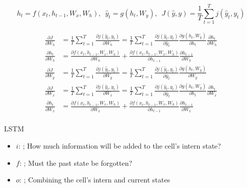 \documentclass{KBook}
\begin{document}
	\[ h_t = f(x_t, h_{t-1}, W_x, W_h),\,\,\, \hat{y}_t = g(h_t, W_y),\,\,\,  J(\hat{y}, y) = \frac{1}{T} \sum_{t=1}^{T} j(\hat{y}_t, y_t)\]
	
	\begin{minipage}{0.6\textwidth}\scriptsize
		\begin{align*}
			\frac{\partial J}{\partial W_h} & = \frac{1}{T} \sum_{t=1}^{T} \frac{\partial j(\hat{y}_t, y_t)}{\partial W_h}
			= \frac{1}{T} \sum_{t=1}^{T} \frac{\partial j(\hat{y}_t, y_t)}{\partial \hat{y}_t} 
			\frac{\partial g(h_t, W_y)}{\partial h_t} 
			\frac{\partial h_t}{\partial W_h} \\
			\frac{\partial h_t}{\partial W_h} & = 
			\frac{\partial f(x_t, h_{t-1}, W_x, W_h)}{\partial W_h} + 
			\frac{\partial f(x_t, h_{t-1}, W_x, W_h)}{\partial h_{t-1}} \frac{\partial h_{t-1}}{\partial W_h} \\
			\frac{\partial J}{\partial W_y} & =
			\frac{1}{T} \sum_{t=1}^{T} \frac{\partial j(\hat{y}_t, y_t)}{\partial W_y}
			= \frac{1}{T} \sum_{t=1}^{T} \frac{\partial j(\hat{y}_t, y_t)}{\partial \hat{y}_t} 
			\frac{\partial g(h_t, W_y)}{\partial W_y} \\
			\frac{\partial J}{\partial W_x} & = 
			\frac{1}{T} \sum_{t=1}^{T} \frac{\partial j(\hat{y}_t, y_t)}{\partial W_x}
			= \frac{1}{T} \sum_{t=1}^{T} \frac{\partial j(\hat{y}_t, y_t)}{\partial \hat{y}_t} 
			\frac{\partial g(h_t, W_y)}{\partial h_t} 
			\frac{\partial h_t}{\partial W_x} \\
			\frac{\partial h_t}{\partial W_x} & = 
			\frac{\partial f(x_t, h_{t-1}, W_x, W_h)}{\partial W_x} + 
			\frac{\partial f(x_t, h_{t-1}, W_x, W_h)}{\partial h_{t-1}} \frac{\partial h_{t-1}}{\partial W_x} \\
		\end{align*}
	\end{minipage}
	\begin{minipage}{0.38\textwidth}
	\end{minipage}
	
LSTM
	
	\begin{minipage}{0.50\textwidth} 
		\begin{itemize}
			\item $i$: ;
			How much information will be added to the cell's intern state?
			\item $f$: ;
			Must the past state be forgotten?
			\item $o$:  ;
			Combining the cell's intern and current states	
		\end{itemize}
	\end{minipage}
	\begin{minipage}{0.49\textwidth}
	\end{minipage}
	
\end{document}
